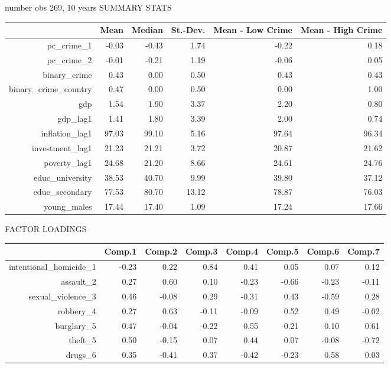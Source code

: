 \documentclass[a4paper,12pt]{article}
\begin{document}
number obs 269, 10 years
SUMMARY STATS
\begin{table}[ht]
\centering
\begin{tabular}{rrrrrr}
  \hline
 & Mean & Median & St.-Dev. & Mean - Low Crime & Mean - High Crime \\ 
  \hline
pc\_crime\_1 & -0.03 & -0.43 & 1.74 & -0.22 & 0.18 \\ 
  pc\_crime\_2 & -0.01 & -0.21 & 1.19 & -0.06 & 0.05 \\ 
  binary\_crime & 0.43 & 0.00 & 0.50 & 0.43 & 0.43 \\ 
  binary\_crime\_country & 0.47 & 0.00 & 0.50 & 0.00 & 1.00 \\ 
  gdp & 1.54 & 1.90 & 3.37 & 2.20 & 0.80 \\ 
  gdp\_lag1 & 1.41 & 1.80 & 3.39 & 2.00 & 0.74 \\ 
  inflation\_lag1 & 97.03 & 99.10 & 5.16 & 97.64 & 96.34 \\ 
  investment\_lag1 & 21.23 & 21.21 & 3.72 & 20.87 & 21.62 \\ 
  poverty\_lag1 & 24.68 & 21.20 & 8.66 & 24.61 & 24.76 \\ 
  educ\_university & 38.53 & 40.70 & 9.99 & 39.80 & 37.12 \\ 
  educ\_secondary & 77.53 & 80.70 & 13.12 & 78.87 & 76.03 \\ 
  young\_males & 17.44 & 17.40 & 1.09 & 17.24 & 17.66 \\ 
   \hline
\end{tabular}
\end{table}

FACTOR LOADINGS
\begin{table}[ht]
\centering
\begin{tabular}{rrrrrrrr}
  \hline
 & Comp.1 & Comp.2 & Comp.3 & Comp.4 & Comp.5 & Comp.6 & Comp.7 \\ 
  \hline
intentional\_homicide\_1 & -0.23 & 0.22 & 0.84 & 0.41 & 0.05 & 0.07 & 0.12 \\ 
  assault\_2 & 0.27 & 0.60 & 0.10 & -0.23 & -0.66 & -0.23 & -0.11 \\ 
  sexual\_violence\_3 & 0.46 & -0.08 & 0.29 & -0.31 & 0.43 & -0.59 & 0.28 \\ 
  robbery\_4 & 0.27 & 0.63 & -0.11 & -0.09 & 0.52 & 0.49 & -0.02 \\ 
  burglary\_5 & 0.47 & -0.04 & -0.22 & 0.55 & -0.21 & 0.10 & 0.61 \\ 
  theft\_5 & 0.50 & -0.15 & 0.07 & 0.44 & 0.07 & -0.08 & -0.72 \\ 
  drugs\_6 & 0.35 & -0.41 & 0.37 & -0.42 & -0.23 & 0.58 & 0.03 \\ 
   \hline
\end{tabular}
\end{table}
\end{document}
